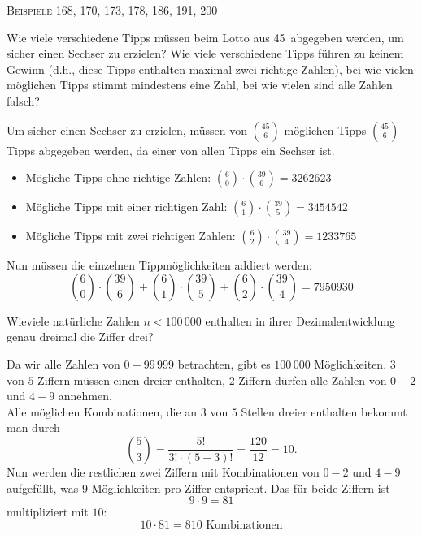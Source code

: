 \documentclass[a4paper, 12pt, margins=2.5cm]{homework}
\begin{document}
  \begin{center}
    \textsc{Beispiele 168, 170, 173, 178, 186, 191, 200}
  \end{center}

  \begin{problem}
    Wie viele verschiedene Tipps müssen beim Lotto  aus 45\grqq\ abgegeben
    werden, um sicher einen Sechser zu erzielen? Wie viele verschiedene Tipps 
    führen zu keinem Gewinn (d.h., diese Tipps enthalten maximal zwei richtige
    Zahlen), bei wie vielen möglichen Tipps stimmt mindestens eine Zahl, bei wie
    vielen sind alle Zahlen falsch?
  \end{problem}
  \begin{solution}
    Um sicher einen Sechser zu erzielen, müssen von $\binom{45}{6}$ möglichen
    Tipps $\binom{45}{6}$ Tipps abgegeben werden, da einer von allen Tipps ein
    Sechser ist.
    \begin{itemize}\itemsep0pt
      \item Mögliche Tipps ohne richtige Zahlen: $\binom{6}{0}\cdot \binom{39}{6} = 3262623$
      \item Mögliche Tipps mit einer richtigen Zahl: $\binom{6}{1}\cdot \binom{39}{5} = 3454542$
      \item Mögliche Tipps mit zwei richtigen Zahlen: $\binom{6}{2}\cdot \binom{39}{4} = 1233765$
    \end{itemize}
    Nun müssen die einzelnen Tippmöglichkeiten addiert werden:
    \[
      \binom{6}{0}\cdot \binom{39}{6} + \binom{6}{1}\cdot \binom{39}{5} +
      \binom{6}{2}\cdot \binom{39}{4} = 7950930
    \]
    
  \end{solution}


  \begin{problem}
    Wieviele natürliche Zahlen $n < 100\,000$ enthalten in ihrer Dezimalentwicklung
    genau dreimal die Ziffer drei?
  \end{problem}
  \begin{solution}
    Da wir alle Zahlen von $0-99\,999$ betrachten, gibt es $100\,000$ Möglichkeiten.
    $3$ von $5$ Ziffern müssen einen dreier enthalten, $2$ Ziffern dürfen alle
    Zahlen von $0-2$ und $4-9$ annehmen. \\

    Alle möglichen Kombinationen, die an $3$ von $5$ Stellen dreier enthalten
    bekommt man durch
    \[ \binom{5}{3} = \frac{5!}{3! \cdot (5-3)!} = \frac{120}{12} = 10. \]
    Nun werden die restlichen zwei Ziffern mit Kombinationen von $0-2$ und $4-9$
    aufgefüllt, was 9 Möglichkeiten pro Ziffer entspricht. Das für beide Ziffern ist
    \[ 9\cdot 9 = 81\]
    multipliziert mit $10$:
    \[ 10 \cdot 81 = 810 \text{ Kombinationen} \]
  \end{solution}
\end{document}
